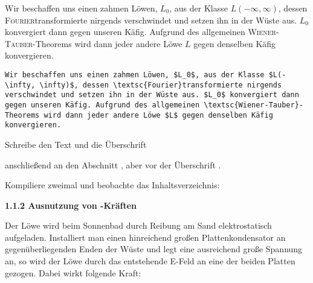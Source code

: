 \begin{frame}[fragile]
	\Losung
	\begin{outputbox}
		Wir beschaffen uns einen zahmen Löwen, $L_0$, aus der Klasse $L(- \infty, \infty)$, dessen \textsc{Fourier}transformierte nirgends verschwindet und setzen ihn in der Wüste aus. $L_0$ konvergiert dann gegen unseren Käfig. Aufgrund des allgemeinen \textsc{Wiener-Tauber}-Theorems wird dann jeder andere Löwe $L$ gegen denselben Käfig konvergieren.
	\end{outputbox}

	\Code
	\begin{lstlisting}[gobble=4]
    Wir beschaffen uns einen zahmen Löwen, $L_0$, aus der Klasse $L(- \infty, \infty)$, dessen \textsc{Fourier}transformierte nirgends verschwindet und setzen ihn in der Wüste aus. $L_0$ konvergiert dann gegen unseren Käfig. Aufgrund des allgemeinen \textsc{Wiener-Tauber}-Theorems wird dann jeder andere Löwe $L$ gegen denselben Käfig konvergieren.
	\end{lstlisting}
\end{frame}
\begin{frame}[fragile]
	\Aufgabee
  Schreibe den Text und die Überschrift

  \textrm{}

  anschließend an den Abschnitt , aber vor der Überschrift .

  Kompiliere zweimal und beobachte das Inhaltsverzeichnis:
  
	\begin{outputbox}
		{ \large\textbf{1.1.2 Ausnutzung von -Kräften}}
		
		Der Löwe wird beim Sonnenbad durch Reibung am Sand elektrostatisch aufgeladen. Installiert man einen hinreichend großen Plattenkondensator an gegenüberliegenden Enden der Wüste und legt eine ausreichend große Spannung an, so wird der Löwe durch das entstehende E-Feld an eine der beiden Platten gezogen. Dabei wirkt folgende Kraft: 
	\end{outputbox}
\end{frame}
